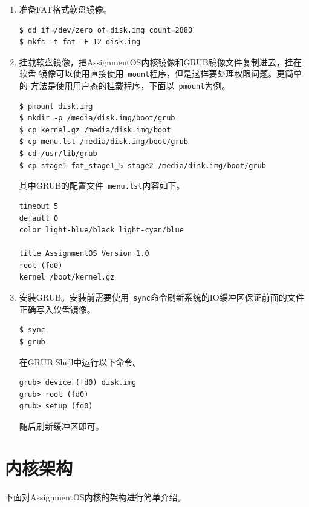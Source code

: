 \documentclass[a4paper, adobefonts]{ctexart}
\begin{document}
\begin{enumerate}
    \item 准备FAT格式软盘镜像。

\begin{verbatim}
$ dd if=/dev/zero of=disk.img count=2880
$ mkfs -t fat -F 12 disk.img
\end{verbatim}

    \item 挂载软盘镜像，把AssignmentOS内核镜像和GRUB镜像文件复制进去，挂在软盘
        镜像可以使用直接使用~\verb|mount|程序，但是这样要处理权限问题。更简单的
        方法是使用用户态的挂载程序，下面以~\verb|pmount|为例。

\begin{verbatim}
$ pmount disk.img
$ mkdir -p /media/disk.img/boot/grub
$ cp kernel.gz /media/disk.img/boot
$ cp menu.lst /media/disk.img/boot/grub
$ cd /usr/lib/grub
$ cp stage1 fat_stage1_5 stage2 /media/disk.img/boot/grub
\end{verbatim}

        其中GRUB的配置文件~\verb|menu.lst|内容如下。

\begin{verbatim}
timeout 5
default 0
color light-blue/black light-cyan/blue

title AssignmentOS Version 1.0
root (fd0)
kernel /boot/kernel.gz
\end{verbatim}

    \item 安装GRUB。安装前需要使用~\verb|sync|命令刷新系统的IO缓冲区保证前面的文件
        正确写入软盘镜像。

\begin{verbatim}
$ sync
$ grub
\end{verbatim}

        在GRUB Shell中运行以下命令。

\begin{verbatim}
grub> device (fd0) disk.img
grub> root (fd0)
grub> setup (fd0)
\end{verbatim}

        随后刷新缓冲区即可。

\end{enumerate}

\section{内核架构}
下面对AssignmentOS内核的架构进行简单介绍。
\end{document}
